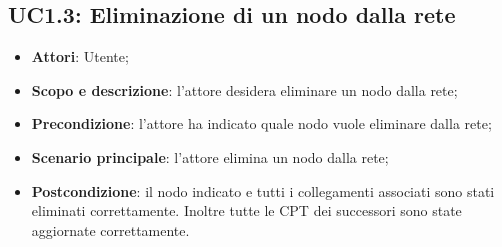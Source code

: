 \subsection{UC1.3: Eliminazione di un nodo dalla rete} 
\hypertarget{UC1.3}{} 
\begin{itemize} 
	\item{\textbf{Attori}: Utente;} 
	\item{\textbf{Scopo e descrizione}: l'attore desidera eliminare un nodo dalla rete;} 
	\item{\textbf{Precondizione}:
		 l'attore ha indicato quale nodo vuole eliminare dalla rete;} 
	 \item{\textbf{Scenario principale}: l'attore elimina un nodo dalla rete;}  
	\item{\textbf{Postcondizione}: il nodo indicato e tutti i collegamenti associati sono stati eliminati correttamente. Inoltre tutte le CPT dei successori sono state aggiornate correttamente.} 
\end{itemize} 
